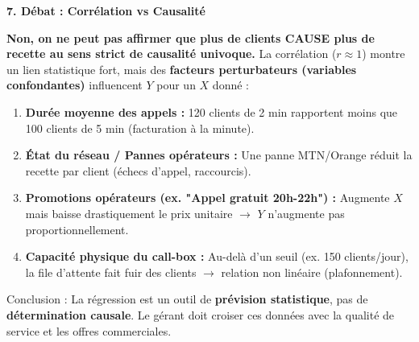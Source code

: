 \documentclass[11pt]{article}
\newcommand{\cle}[1]{{\popxbold\color{popdark}#1}}
\begin{document}
\begin{exoresolu}
\textbf{7. Débat : Corrélation vs Causalité}\par
\textbf{Non, on ne peut pas affirmer que plus de clients \textbf{CAUSE} plus de recette au sens strict de causalité univoque.}
La corrélation ($r \approx 1$) montre un lien statistique fort, mais des \textbf{facteurs perturbateurs (variables confondantes)} influencent $Y$ pour un $X$ donné :
\begin{enumerate}
    \item \textbf{Durée moyenne des appels :} 120 clients de 2 min rapportent moins que 100 clients de 5 min (facturation à la minute).
    \item \textbf{État du réseau / Pannes opérateurs :} Une panne MTN/Orange réduit la recette par client (échecs d'appel, raccourcis).
    \item \textbf{Promotions opérateurs (ex. "Appel gratuit 20h-22h") :} Augmente $X$ mais baisse drastiquement le prix unitaire $\to$ $Y$ n'augmente pas proportionnellement.
    \item \textbf{Capacité physique du call-box :} Au-delà d'un seuil (ex. 150 clients/jour), la file d'attente fait fuir des clients $\to$ relation non linéaire (plafonnement).
\end{enumerate}
\cle{Conclusion} : La régression est un outil de \textbf{prévision statistique}, pas de \textbf{détermination causale}. Le gérant doit croiser ces données avec la qualité de service et les offres commerciales.
\end{exoresolu}
\end{document}
